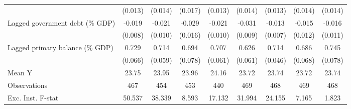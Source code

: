 {\begin{tabular}{l*{8}{c}}
                    &     (0.013)         &     (0.014)         &     (0.017)         &     (0.013)         &     (0.014)         &     (0.013)         &     (0.014)         &     (0.014)         \\
\addlinespace
Lagged government debt (\% GDP)&      -0.019\sym{**} &      -0.021\sym{**} &      -0.029\sym{*}  &      -0.021\sym{**} &      -0.031\sym{***}&      -0.013\sym{*}  &      -0.015         &      -0.016         \\
                    &     (0.008)         &     (0.010)         &     (0.016)         &     (0.010)         &     (0.009)         &     (0.007)         &     (0.012)         &     (0.011)         \\
\addlinespace
Lagged primary balance (\% GDP)&       0.729\sym{***}&       0.714\sym{***}&       0.694\sym{***}&       0.707\sym{***}&       0.626\sym{***}&       0.714\sym{***}&       0.686\sym{***}&       0.745\sym{***}\\
                    &     (0.066)         &     (0.059)         &     (0.078)         &     (0.061)         &     (0.061)         &     (0.046)         &     (0.068)         &     (0.078)         \\
\midrule
Mean Y              &       23.75         &       23.95         &       23.96         &       24.16         &       23.72         &       23.74         &       23.72         &       23.74         \\
Observations        &         467         &         454         &         453         &         440         &         469         &         468         &         469         &         468         \\
Exc. Inst. F-stat   &      50.537         &      38.339         &       8.593         &      17.132         &      31.994         &      24.155         &       7.165         &       1.823         \\
\bottomrule
\end{tabular}
}
